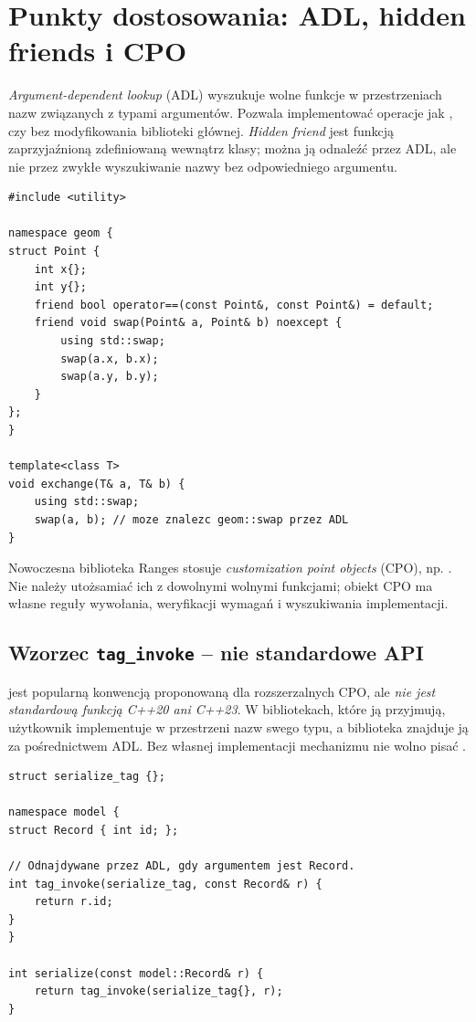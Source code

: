 \section{Punkty dostosowania: ADL, hidden friends i CPO}
\label{sec:cpp20-adl}

\emph{Argument-dependent lookup} (ADL) wyszukuje wolne funkcje
w przestrzeniach nazw związanych z typami argumentów. Pozwala
implementować operacje jak ,  czy
 bez modyfikowania biblioteki głównej.
\emph{Hidden friend} jest funkcją zaprzyjaźnioną zdefiniowaną
wewnątrz klasy; można ją odnaleźć przez ADL, ale nie przez zwykłe
wyszukiwanie nazwy bez odpowiedniego argumentu.

\begin{lstlisting}[caption={Hidden friend i idiom wywolywania swap przez ADL.}]
#include <utility>

namespace geom {
struct Point {
    int x{};
    int y{};
    friend bool operator==(const Point&, const Point&) = default;
    friend void swap(Point& a, Point& b) noexcept {
        using std::swap;
        swap(a.x, b.x);
        swap(a.y, b.y);
    }
};
}

template<class T>
void exchange(T& a, T& b) {
    using std::swap;
    swap(a, b); // moze znalezc geom::swap przez ADL
}
\end{lstlisting}

Nowoczesna biblioteka Ranges stosuje \emph{customization point objects}
(CPO), np. . Nie należy utożsamiać ich
z dowolnymi wolnymi funkcjami; obiekt CPO ma własne reguły wywołania,
weryfikacji wymagań i wyszukiwania implementacji.

\subsection{Wzorzec \texttt{tag\_invoke} -- nie standardowe API}

 jest popularną konwencją proponowaną dla rozszerzalnych
CPO, ale \emph{nie jest standardową funkcją C++20 ani C++23}.
W bibliotekach, które ją przyjmują, użytkownik implementuje
 w przestrzeni nazw swego typu,
a biblioteka znajduje ją za pośrednictwem ADL. Bez własnej implementacji
mechanizmu nie wolno pisać .

\begin{lstlisting}[caption={Minimalna ilustracja konwencji tag\_invoke (fragment).}]
struct serialize_tag {};

namespace model {
struct Record { int id; };

// Odnajdywane przez ADL, gdy argumentem jest Record.
int tag_invoke(serialize_tag, const Record& r) {
    return r.id;
}
}

int serialize(const model::Record& r) {
    return tag_invoke(serialize_tag{}, r);
}
\end{lstlisting}

